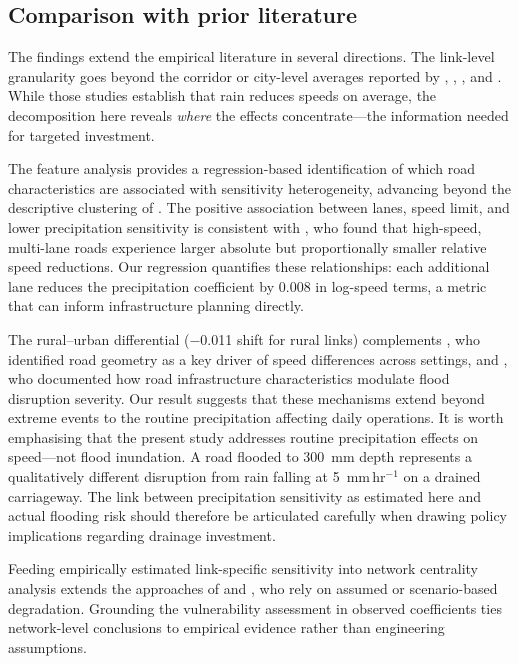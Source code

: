 \documentclass[review]{elsarticle}
\begin{document}
\subsection{Comparison with prior literature}
\label{sec:disc:lit}

The findings extend the empirical literature in several directions. The link-level granularity goes beyond the corridor or city-level averages reported by \citet{hranac2006empirical}, \citet{becker2026rainfall}, \citet{koetse2009impact}, and \citet{bi2022weather}. While those studies establish that rain reduces speeds on average, the decomposition here reveals \textit{where} the effects concentrate---the information needed for targeted investment.

The feature analysis provides a regression-based identification of which road characteristics are associated with sensitivity heterogeneity, advancing beyond the descriptive clustering of \citet{gao2024resilience}. The positive association between lanes, speed limit, and lower precipitation sensitivity is consistent with \citet{becker2026rainfall}, who found that high-speed, multi-lane roads experience larger absolute but proportionally smaller relative speed reductions. Our regression quantifies these relationships: each additional lane reduces the precipitation coefficient by 0.008 in log-speed terms, a metric that can inform infrastructure planning directly.

The rural--urban differential ($-$0.011 shift for rural links) complements \citet{raccagni2024urban}, who identified road geometry as a key driver of speed differences across settings, and \citet{pregnolato2017depth}, who documented how road infrastructure characteristics modulate flood disruption severity. Our result suggests that these mechanisms extend beyond extreme events to the routine precipitation affecting daily operations. It is worth emphasising that the present study addresses routine precipitation effects on speed---not flood inundation. A road flooded to 300~mm depth represents a qualitatively different disruption from rain falling at 5~mm\,hr$^{-1}$ on a drained carriageway. The link between precipitation sensitivity as estimated here and actual flooding risk should therefore be articulated carefully when drawing policy implications regarding drainage investment.

Feeding empirically estimated link-specific sensitivity into network centrality analysis extends the approaches of \citet{wassmer2024resilience} and \citet{stamos2023centrality}, who rely on assumed or scenario-based degradation. Grounding the vulnerability assessment in observed coefficients ties network-level conclusions to empirical evidence rather than engineering assumptions.
\end{document}
